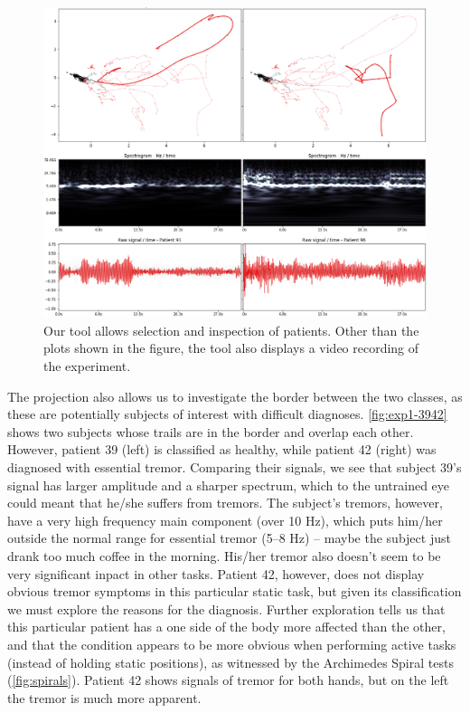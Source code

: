 \begin{figure}[ht]
\centering
\includegraphics[width=\linewidth]{figures/nemo/exp1-9196.png}
\caption{Our tool allows selection and inspection of patients. Other than the plots shown in the figure, the tool also displays a video recording of the experiment. }
\label{fig:exp1-9196}
\end{figure}

The projection also allows us to investigate the border between the two classes, as these are potentially subjects of interest with difficult diagnoses.
\cref{fig:exp1-3942} shows two subjects whose trails are in the border and overlap each other. However, patient 39 (left) is classified as healthy, while patient 42 (right) was diagnosed with essential tremor. Comparing their signals, we see that subject 39's signal has larger amplitude and a sharper spectrum, which to the untrained eye could meant that he/she suffers from tremors. The subject's tremors, however, have a very high frequency main component (over 10 Hz), which puts him/her outside the normal range for essential tremor (5--8 Hz) -- maybe the subject just drank too much coffee in the morning. His/her tremor also doesn't seem to be very significant inpact in other tasks. Patient 42, however, does not display obvious tremor symptoms in this particular static task, but given its classification we must explore the reasons for the diagnosis. Further exploration tells us that this particular patient has a one side of the body more affected than the other, and that the condition appears to be more obvious when performing active tasks (instead of holding static positions), as witnessed by the Archimedes Spiral tests (\cref{fig:spirals}). Patient 42 shows signals of tremor for both hands, but on the left the tremor is much more apparent.



